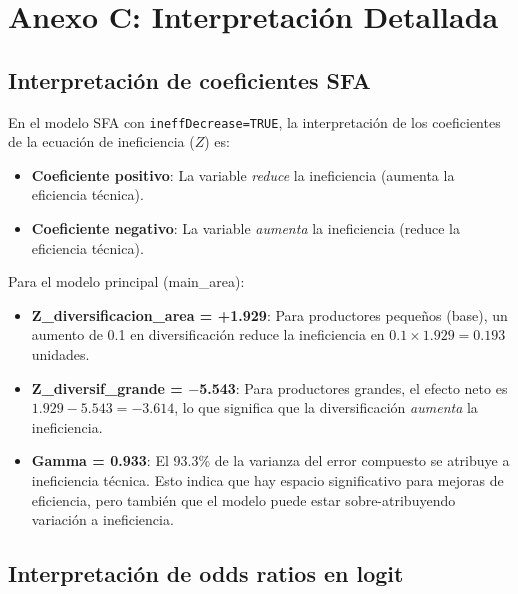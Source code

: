 \documentclass[11pt,a4paper]{article}
\begin{document}
\section{Anexo C: Interpretación Detallada}

\subsection{Interpretación de coeficientes SFA}

En el modelo SFA con \texttt{ineffDecrease=TRUE}, la interpretación de los coeficientes de la ecuación de ineficiencia ($Z$) es:

\begin{itemize}
    \item \textbf{Coeficiente positivo}: La variable \textit{reduce} la ineficiencia (aumenta la eficiencia técnica).
    \item \textbf{Coeficiente negativo}: La variable \textit{aumenta} la ineficiencia (reduce la eficiencia técnica).
\end{itemize}

Para el modelo principal (main\_area):
\begin{itemize}
    \item \textbf{Z\_diversificacion\_area = +1.929}: Para productores pequeños (base), un aumento de 0.1 en diversificación reduce la ineficiencia en $0.1 \times 1.929 = 0.193$ unidades.
    
    \item \textbf{Z\_diversif\_grande = $-$5.543}: Para productores grandes, el efecto neto es $1.929 - 5.543 = -3.614$, lo que significa que la diversificación \textit{aumenta} la ineficiencia.
    
    \item \textbf{Gamma = 0.933}: El 93.3\% de la varianza del error compuesto se atribuye a ineficiencia técnica. Esto indica que hay espacio significativo para mejoras de eficiencia, pero también que el modelo puede estar sobre-atribuyendo variación a ineficiencia.
\end{itemize}

\subsection{Interpretación de odds ratios en logit}
\end{document}
